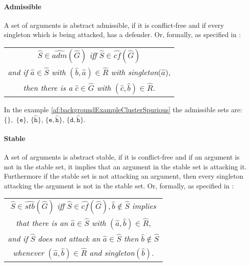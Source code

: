 \paragraph{Admissible} A set of arguments is abstract admissible, if it is conflict-free and if every singleton which is being attacked, has a defender. Or, formally, as specified in \cite{DBLP:conf/kr/SaribaturW21}:

\begin{center}
    \begin{tabular}{c}
        $\hat{S} \in \hat{adm}(\hat{G})$ \textit{iff} $\hat{S} \in \hat{cf}(\hat{G})$\\

        \textit{and if} $\hat{a} \in \hat{S}$ \textit{with} $(\hat{b}, \hat{a}) \in \hat{R}$ \textit{with singleton}($\hat{a}$),\\

        \textit{then there is a} $\hat{c} \in \hat{G}$ \textit{with} $(\hat{c}, \hat{b}) \in \hat{R}$.
    \end{tabular}
\end{center}

In the example \ref{af:backgroundExampleClusterSpurious} the admissible sets are:
$\mathtt{\{\}},$
$\mathtt{\{e}\}$,
$\mathtt{\{\hat{h}}\}$,
$\mathtt{\{e, \hat{h}}\}$,
$\mathtt{\{d, \hat{h}}\}$.



\paragraph{Stable} A set of arguments is abstract stable, if it is conflict-free and if an argument is not in the stable set, it implies that an argument in the stable set is attacking it. Furthermore if the stable set is not attacking an argument, then every singleton attacking the argument is not in the stable set. Or, formally, as specified in \cite{DBLP:conf/kr/SaribaturW21}:
\begin{center}
    \begin{tabular}{c}
        $\hat{S} \in \hat{stb}(\hat{G})$ \textit{iff} $\hat{S} \in \hat{cf}(\hat{G}),  \hat{b} \not\in \hat{S}$ \textit{implies}\\

        \textit{that there is an} $\hat{a} \in \hat{S}$ \textit{with} $(\hat{a}, \hat{b}) \in \hat{R}$,\\

        \textit{and if} $\hat{S}$ \textit{does not attack an} $\hat{a} \in \hat{S}$ \textit{then} $\hat{b} \not\in \hat{S}$\\

        \textit{whenever} $(\hat{a}, \hat{b}) \in \hat{R}$ \textit{and singleton}$(\hat{b})$.
    \end{tabular}
\end{center}

